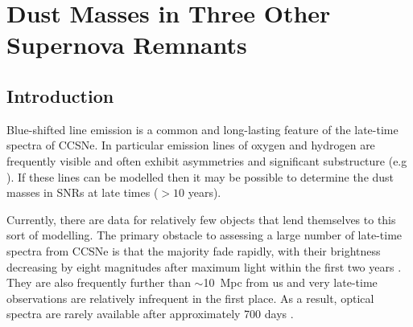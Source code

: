 \chapter[Dust Masses in Three Other Supernova Remnants]{Dust Masses in Three Other \\ Supernova Remnants}\label{chp:chp6}

%
%

\section{Introduction}

Blue-shifted line emission is a common and long-lasting feature of the late-time spectra of CCSNe.  In particular  emission lines of oxygen and hydrogen are frequently visible and often exhibit asymmetries and significant substructure (e.g \citealt{Milisavljevic2012}).  If these lines can be modelled then it may be possible to determine the dust masses in SNRs at late times ($>10$ years).

Currently, there are data for relatively few objects that lend themselves to this sort of modelling.  The primary obstacle to assessing a large number of late-time spectra from CCSNe is that the majority fade rapidly,  with their brightness decreasing by eight magnitudes after maximum light within the first two years \citep{Kirshner1990}.  They are also frequently further than $\sim$10~Mpc from us and very late-time observations are relatively infrequent in the first place.  As a result, optical spectra are rarely available after approximately 700 days \citep{Milisavljevic2012}.  

